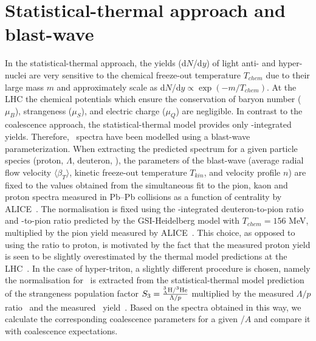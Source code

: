 \section{Statistical-thermal approach and blast-wave}\label{sec:thermal}

In the statistical-thermal approach, the yields (d$N$/d$y$) of light anti- and hyper-nuclei are very sensitive to the chemical freeze-out temperature $T_{chem}$ due to their large mass $m$ and approximately scale as d$N$/d$y \propto \exp(-m/T_{chem})$. 
At the LHC the chemical potentials which ensure the conservation of baryon number ($\mu_{B}$), strangeness ($\mu_{S}$), and electric charge ($\mu_{Q}$) are negligible.
In contrast to the coalescence approach, the statistical-thermal model \cite{Petran:2013dva,Wheaton:2004qb,Andronic:2005yp} provides only \pt-integrated yields. 
Therefore, \pt~spectra have been modelled using a blast-wave~\cite{Schnedermann:1993ws} parameterization. When extracting the predicted spectrum for a given particle species (proton, $\Lambda$, deuteron, \hethree), the parameters of the blast-wave (average radial flow velocity $\langle\beta_{T}\rangle$, kinetic freeze-out temperature $T_{kin}$, and velocity profile $n$) are fixed to the values obtained from the simultaneous fit to the pion, kaon and proton spectra measured in Pb--Pb collisions as a function of centrality by ALICE~\cite{Abelev:2013vea}. 
The normalisation is fixed using the \pt-integrated deuteron-to-pion ratio and \hethree-to-pion ratio predicted by the GSI-Heidelberg model with $T_{chem} = 156$ MeV, multiplied by the pion yield measured by ALICE~\cite{Abelev:2013vea}. 
This choice, as opposed to using the ratio to proton, is motivated by the fact that the measured proton yield is seen to be slightly overestimated by the thermal model predictions at the LHC~\cite{Abelev:2012wca}.
In the case of hyper-triton, a slightly different procedure is chosen, namely the normalisation for \hthreelambda~is extracted from the statistical-thermal model prediction of the strangeness population factor $S_{3} = { _{\Lambda}^{3}\mathrm{H} / ^{3}{\mathrm{He}} \over \Lambda/p}$ multiplied by the measured $\Lambda/p$ ratio~\cite{Abelev:2013vea,Abelev:2013xaa} and the measured \hethree~yield~\cite{ALICE:deuteronppPbPb2015}. Based on the spectra obtained in this way, we calculate the corresponding coalescence parameters for a given \pt/$A$ and compare it with coalescence expectations. 
